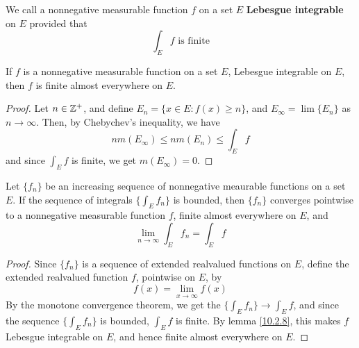 \begin{definition}
    We call a nonnegative measurable function $f$ on a set  $E$
    \textbf{Lebesgue integrable} on $E$ provided that
    \begin{equation*}
        \int_E{f} \text{ is finite}
    \end{equation*}
\end{definition}

\begin{lemma}\label{10.2.8}
    If $f$ is a nonnegative measurable function on a set  $E$, Lebesgue
    integrable on  $E$, then  $f$ is finite almost everywhere on  $E$.
\end{lemma}
\begin{proof}
    Let $n \in \mathbb{Z}^+$, and define  $E_n=\{x \in E : f(x) \geq n\}$, and
    $E_\infty=\lim{\{E_n\}}$ as $n \xrightarrow{} \infty$. Then, by Chebychev's
    inequality, we have
    \begin{equation*}
        nm(E_\infty) \leq nm(E_n) \leq \int_E{f}
    \end{equation*}
    and since $\int_E{f}$ is finite, we get $m(E_\infty)=0$.
\end{proof}

\begin{lemma}\label{10.2.9}
    Let $\{f_n\}$ be an increasing sequence of nonnegative meaurable functions
    on a set $E$. If the sequence of integrals  $\{\int_E{f_n}\}$ is bounded,
    then $\{f_n\}$ converges pointwise to a nonnegative measurable function $f$,
    finite almost everywhere on $E$, and
    \begin{equation*}
        \lim_{n \xrightarrow{} \infty}{\int_E{f_n}}=\int_E{f}
    \end{equation*}
\end{lemma}
\begin{proof}
    Since $\{f_n\}$ is a sequence of extended realvalued functions on $E$,
    define the extended realvalued function $f$, pointwise on  $E$, by
    \begin{equation*}
        f(x)=\lim_{x \xrightarrow{} \infty}{f(x)}
    \end{equation*}
    By the monotone convergence theorem, we get the $\{\int_E{f_n}\}
    \xrightarrow{} \int_E{f}$, and since the sequence $\{\int_E{f_n}\}$ is
    bounded, $\int_E{f}$ is finite. By lemma \ref{10.2.8}, this makes $f$
    Lebesgue integrable on $E$, and hence finite almost everywhere on  $E$.
\end{proof}
